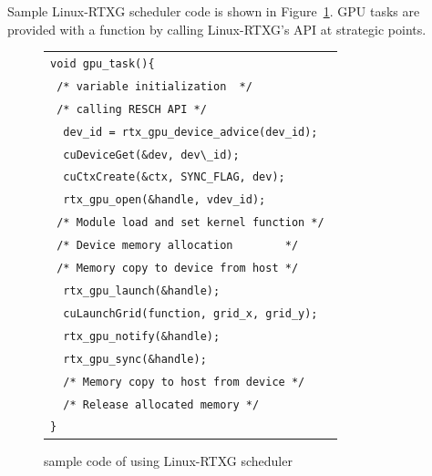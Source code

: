 Sample Linux-RTXG scheduler code is shown in Figure~\ref{fig:sample}.
GPU tasks are provided with a function by calling Linux-RTXG's API at strategic points.

\begin{figure}[!t]
\begin{center}
\begin{tabular}{l}
\hline\hline
{\scriptsize \verb|void gpu_task(){        |}\\
{\scriptsize \verb| /* variable initialization  */        |}\\
{\scriptsize \verb| /* calling RESCH API */        |}\\
{\scriptsize \verb|  dev_id = rtx_gpu_device_advice(dev_id); |}\\
{\scriptsize \verb|  cuDeviceGet(&dev, dev\_id);           |}\\
{\scriptsize \verb|  cuCtxCreate(&ctx, SYNC_FLAG, dev);    |}\\
{\scriptsize \verb|  rtx_gpu_open(&handle, vdev_id);     |}\\
{\scriptsize \verb| /* Module load and set kernel function */ |}\\
{\scriptsize \verb| /* Device memory allocation        */ |}\\
{\scriptsize \verb| /* Memory copy to device from host */ |}\\
{\scriptsize \verb|  rtx_gpu_launch(&handle); |}\\
{\scriptsize \verb|  cuLaunchGrid(function, grid_x, grid_y); |}\\
{\scriptsize \verb|  rtx_gpu_notify(&handle); |}\\
{\scriptsize \verb|  rtx_gpu_sync(&handle);   |}\\
{\scriptsize \verb|  /* Memory copy to host from device */  |}\\
{\scriptsize \verb|  /* Release allocated memory */  |}\\
{\scriptsize \verb|}|}\\
\hline\hline
\end{tabular}
\caption{sample code of using Linux-RTXG scheduler}
\label{fig:sample}
\end{center}
\end{figure}

